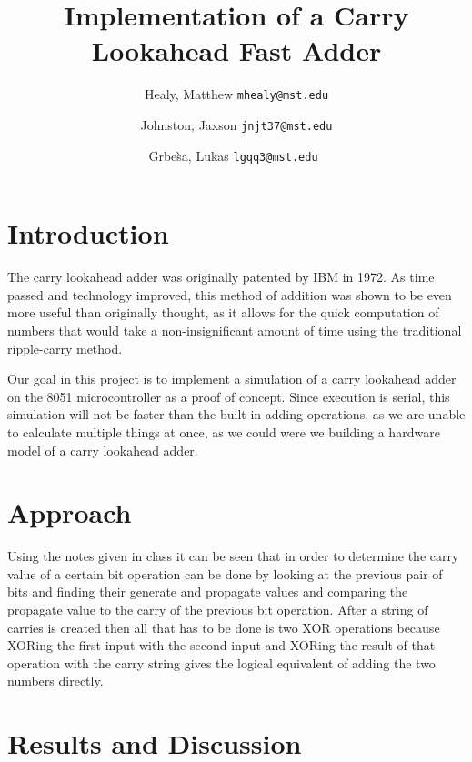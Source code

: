 \documentclass[journal]{IEEEtran}
\begin{document}
\title{Implementation of a Carry Lookahead Fast Adder}
\author{
	Healy, Matthew
	\texttt{mhealy@mst.edu}\\
	\and
	Johnston, Jaxson
	\texttt{jnjt37@mst.edu}\\
	\and
	Grbe\`sa, Lukas
	\texttt{lgqq3@mst.edu}\
}

\maketitle


\begin{abstract}

\end{abstract}

\section{Introduction}\label{sec:intro}
The carry lookahead adder was originally patented by IBM\cite{patent} in 1972.
As time passed and technology improved, this method of addition was shown
to be even more useful than originally thought, as it allows for the quick
computation of numbers that would take a non-insignificant amount of time
using the traditional ripple-carry method.

Our goal in this project is to implement a simulation of a carry lookahead
adder on the 8051 microcontroller as a proof of concept. Since execution is
serial, this simulation will not be faster than the built-in adding operations,
as we are unable to calculate multiple things at once, as we could were we
building a hardware model of a carry lookahead adder.

\section{Approach}\label{sec:approach}
Using the notes given in class it can be seen that in order to determine the
carry value of a certain bit operation can be done by looking at the previous
pair of bits and finding their generate and propagate values and comparing the
propagate value to the carry of the previous bit operation. After a string of
carries is created then all that has to be done is two XOR operations because
XORing the first input with the second input and XORing the result of that
operation with the carry string gives the logical equivalent of adding the two
numbers directly.

\section{Results and Discussion}\label{sec:discuss}
\end{document}
